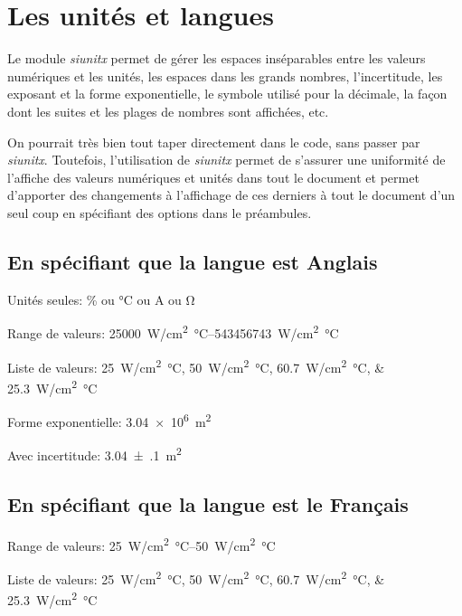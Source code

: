 \documentclass[exemple_master.tex]{subfiles}
\begin{document}
\section{Les unités et langues}

Le module \emph{siunitx} permet de gérer les espaces inséparables entre les valeurs numériques et les unités, les espaces dans les grands nombres, l'incertitude, les exposant et la forme exponentielle, le symbole utilisé pour la décimale, la façon dont les suites et les plages de nombres sont affichées, etc.

On pourrait très bien tout taper directement dans le code, sans passer par \emph{siunitx}. Toutefois, l'utilisation de \emph{siunitx} permet de s'assurer une uniformité de l'affiche des valeurs numériques et unités dans tout le document et permet d'apporter des changements à l'affichage de ces derniers à tout le document d'un seul coup en spécifiant des options dans le préambules.

\subsection{En spécifiant que la langue est Anglais}

Unités seules: \si{\percent} ou \si{\celsius} ou \si{\ampere} ou \si{\ohm}

Range de valeurs: \SIrange{25000}{543456743}{W/cm^2 \celsius}

Liste de valeurs: \SIlist{25;50;60.7;25.3}{W/cm^2 \celsius}

Forme exponentielle: \SI{3.04e6}{m^2}

Avec incertitude: \SI{3.04(10)}{m^2}

\subsection{En spécifiant que la langue est le Français}

Range de valeurs: \SIrange{25}{50}{W/cm^2 \celsius}

Liste de valeurs: \SIlist{25;50;60.7;25.3}{W/cm^2 \celsius}
\end{document}
